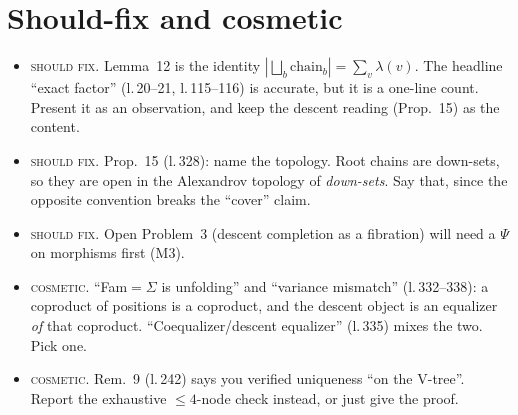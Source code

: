 \documentclass[11pt]{article}
\newcommand{\iss}[1]{\textsc{#1}}
\begin{document}
\section{Should-fix and cosmetic}
\begin{itemize}[leftmargin=*]
\item \iss{should fix}. Lemma~12 is the identity $|\bigsqcup_b\mathrm{chain}_b|=\sum_v\lambda(v)$.
The headline ``exact factor'' (l.\,20--21, l.\,115--116) is accurate, but it is a one-line count.
Present it as an observation, and keep the descent reading (Prop.~15) as the content.
\item \iss{should fix}. Prop.~15 (l.\,328): name the topology. Root chains are down-sets, so they
are open in the Alexandrov topology of \emph{down-sets}. Say that, since the opposite convention
breaks the ``cover'' claim.
\item \iss{should fix}. Open Problem~3 (descent completion as a fibration) will need a $\Psi$ on
morphisms first (M3).
\item \iss{cosmetic}. ``Fam$=\Sigma$ is unfolding'' and ``variance mismatch'' (l.\,332--338): a
coproduct of positions is a coproduct, and the descent object is an equalizer \emph{of} that
coproduct. ``Coequalizer/descent equalizer'' (l.\,335) mixes the two. Pick one.
\item \iss{cosmetic}. Rem.~9 (l.\,242) says you verified uniqueness ``on the V-tree''. Report the
exhaustive $\le4$-node check instead, or just give the proof.
\end{itemize}
\end{document}
